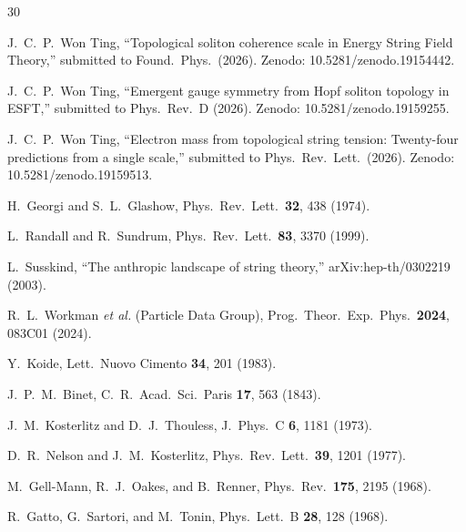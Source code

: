 ﻿\documentclass[twocolumn,preprintnumbers,amsmath,amssymb,prd]{revtex4-2}
\begin{document}
\begin{thebibliography}{30}

 J.~C.~P.~Won Ting, ``Topological soliton coherence scale in Energy String Field Theory,'' submitted to Found.\ Phys.\ (2026). Zenodo: 10.5281/zenodo.19154442.

 J.~C.~P.~Won Ting, ``Emergent gauge symmetry from Hopf soliton topology in ESFT,'' submitted to Phys.\ Rev.\ D (2026). Zenodo: 10.5281/zenodo.19159255.

 J.~C.~P.~Won Ting, ``Electron mass from topological string tension: Twenty-four predictions from a single scale,'' submitted to Phys.\ Rev.\ Lett.\ (2026). Zenodo: 10.5281/zenodo.19159513.

 H.~Georgi and S.~L.~Glashow, Phys.\ Rev.\ Lett.\ \textbf{32}, 438 (1974).

 L.~Randall and R.~Sundrum, Phys.\ Rev.\ Lett.\ \textbf{83}, 3370 (1999).

 L.~Susskind, ``The anthropic landscape of string theory,'' arXiv:hep-th/0302219 (2003).

 R.~L.~Workman \textit{et al.} (Particle Data Group), Prog.\ Theor.\ Exp.\ Phys.\ \textbf{2024}, 083C01 (2024).

 Y.~Koide, Lett.\ Nuovo Cimento \textbf{34}, 201 (1983).

 J.~P.~M.~Binet, C.\ R.\ Acad.\ Sci.\ Paris \textbf{17}, 563 (1843).

 J.~M.~Kosterlitz and D.~J.~Thouless, J.\ Phys.\ C \textbf{6}, 1181 (1973).

 D.~R.~Nelson and J.~M.~Kosterlitz, Phys.\ Rev.\ Lett.\ \textbf{39}, 1201 (1977).

 M.~Gell-Mann, R.~J.~Oakes, and B.~Renner, Phys.\ Rev.\ \textbf{175}, 2195 (1968).

 R.~Gatto, G.~Sartori, and M.~Tonin, Phys.\ Lett.\ B \textbf{28}, 128 (1968).

\end{thebibliography}
\end{document}
